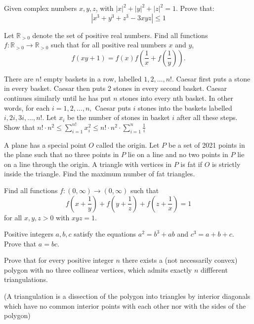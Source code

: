 \documentclass[11pt]{scrartcl}
\begin{document}
\begin{problem}[3569315369731177689]
Given complex numbers $x,y,z$, with $|x|^2+|y|^2+|z|^2=1$. Prove that:$$|x^3+y^3+z^3-3xyz| \le 1$$
\end{problem}
\begin{problem}[3569981165307602347]
Let \(\mathbb R_{>0}\) denote the set of positive real numbers. Find all functions \(f:\mathbb R_{>0}\to\mathbb R_{>0}\) such that for all positive real numbers \(x\) and \(y\),\[f(xy+1)=f(x)f\left(\frac1x+f\left(\frac1y\right)\right).\]
\end{problem}
\begin{problem}[3579058550991835669]
There are $n!$ empty baskets in a row, labelled $1, 2, . . . , n!$. Caesar
first puts a stone in every basket. Caesar then puts 2 stones in every second basket.
Caesar continues similarly until he has put $n$ stones into every nth basket. In
other words, for each $i = 1, 2, . . . , n,$ Caesar puts $i$ stones into the baskets labelled
$i, 2i, 3i, . . . , n!.$
Let $x_i$ be the number of stones in basket $i$ after all these steps. Show that
$n! \cdot n^2 \leq \sum_{i=1}^{n!} x_i^2 \leq n! \cdot n^2 \cdot \sum_{i=1}^{n} \frac{1}{i} $
\end{problem}
\begin{problem}[3600625270766782129]
A plane has a special point $O$ called the origin. Let $P$ be a set of 2021 points in the plane such that
no three points in $P$ lie on a line and
no two points in $P$ lie on a line through the origin.
A triangle with vertices in $P$ is fat if $O$ is strictly inside the triangle. Find the maximum number of fat triangles.
\end{problem}
\begin{problem}[3626448942281457521]
	Find all functions $f:(0,\infty) \rightarrow (0,\infty)$ such that\[f\left(x+\frac{1}{y}\right)+f\left(y+\frac{1}{z}\right) + f\left(z+\frac{1}{x}\right) = 1\]for all $x,y,z >0$ with $xyz =1$.
\end{problem}
\begin{problem}[3668523407320812071]
	Positive integers $a,b,c$ satisfy the equations $a^2=b^3+ab$ and $c^3=a+b+c$. Prove that $a=bc$.
\end{problem}
\begin{problem}[3706706337726127226]
Prove that for every positive integer $n$ there exists a (not necessarily convex) polygon with no three collinear vertices, which admits exactly $n$ diffferent triangulations.

(A triangulation is a dissection of the polygon into triangles by interior diagonals which have no common interior points with each other nor with the sides of the polygon)
\end{problem}
\end{document}
